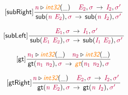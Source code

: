 \documentclass[11pt]{book}
\newcommand{\artVariable}[1]{\mbox{\color{purple}\em #1\/}}
\newcommand{\artConstructor}[1]{\mbox{\sf #1}}
\newcommand{\artSpecial}[1]{\mbox{\color{orange}\sf\em #1}}
\begin{document}
\begin{equation}
\tag*{[\artConstructor{\sf subRight}]}
\begin{split}\frac{ \artVariable{n}\triangleright \artSpecial{int32}(\_) \quad \, \artVariable{E$_{2}$}, \artVariable{$\sigma$}\, \rightarrow \, \artVariable{I$_{2}$}, \artVariable{$\sigma$\/$^\prime$}\, }{\, \artConstructor{\sf sub}(\artVariable{n}\ \artVariable{E$_{2}$}), \artVariable{$\sigma$}\, \rightarrow \, \artConstructor{\sf sub}(\artVariable{n}\ \artVariable{I$_{2}$}), \artVariable{$\sigma$\/$^\prime$}\, }
\end{split}
\end{equation}

\begin{equation}
\tag*{[\artConstructor{\sf subLeft}]}
\begin{split}\frac{\, \artVariable{E$_{1}$}, \artVariable{$\sigma$}\, \rightarrow \, \artVariable{I$_{1}$}, \artVariable{$\sigma$\/$^\prime$}\, }{\, \artConstructor{\sf sub}(\artVariable{E$_{1}$}\ \artVariable{E$_{2}$}), \artVariable{$\sigma$}\, \rightarrow \, \artConstructor{\sf sub}(\artVariable{I$_{1}$}\ \artVariable{E$_{2}$}), \artVariable{$\sigma$\/$^\prime$}\, }
\end{split}
\end{equation}

\begin{equation}
\tag*{[\artConstructor{\sf gt}]}
\begin{split}\frac{ \artVariable{n$_{1}$}\triangleright \artSpecial{int32}(\_) \quad  \artVariable{n$_{2}$}\triangleright \artSpecial{int32}(\_) }{\, \artConstructor{\sf gt}(\artVariable{n$_{1}$}\ \artVariable{n$_{2}$}), \artVariable{$\sigma$}\, \rightarrow \, \artSpecial{gt}(\artVariable{n$_{1}$}\ \artVariable{n$_{2}$}), \artVariable{$\sigma$}\, }
\end{split}
\end{equation}

\begin{equation}
\tag*{[\artConstructor{\sf gtRight}]}
\begin{split}\frac{ \artVariable{n}\triangleright \artSpecial{int32}(\_) \quad \, \artVariable{E$_{2}$}, \artVariable{$\sigma$}\, \rightarrow \, \artVariable{I$_{2}$}, \artVariable{$\sigma$\/$^\prime$}\, }{\, \artConstructor{\sf gt}(\artVariable{n}\ \artVariable{E$_{2}$}), \artVariable{$\sigma$}\, \rightarrow \, \artConstructor{\sf gt}(\artVariable{n}\ \artVariable{I$_{2}$}), \artVariable{$\sigma$\/$^\prime$}\, }
\end{split}
\end{equation}
\end{document}

